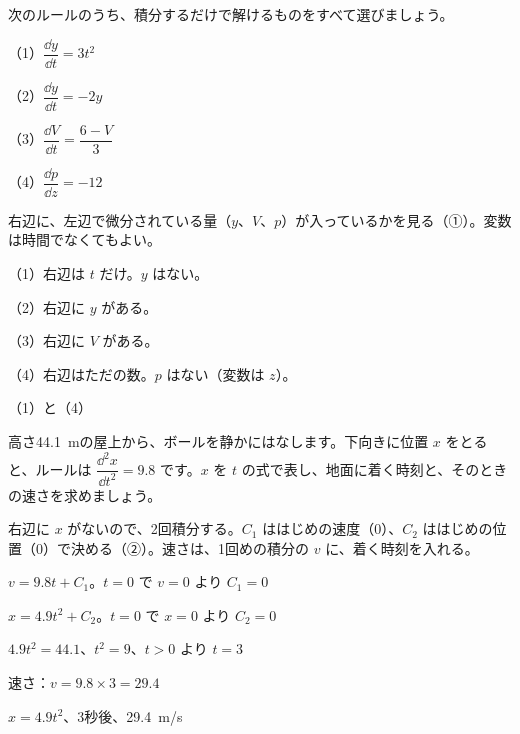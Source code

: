 \begin{kotoba}
\small
{}
\end{kotoba}


\begin{reidai}[積分するだけで解ける形を見分ける]
次のルールのうち、積分するだけで解けるものをすべて選びましょう。\par
（1）$\dfrac{\dd y}{\dd t}=3t^2$\par
（2）$\dfrac{\dd y}{\dd t}=-2y$\par
（3）$\dfrac{\dd V}{\dd t}=\dfrac{6-V}{3}$\par
（4）$\dfrac{\dd p}{\dd z}=-12$\par
\kangaekata 右辺に、左辺で微分されている量（$y$、$V$、$p$）が入っているかを見る（①）。変数は時間でなくてもよい。\par
\shiki（1）右辺は $t$ だけ。$y$ はない。\par
\bkvidl（2）右辺に $y$ がある。\par
\bkvidl（3）右辺に $V$ がある。\par
\bkvidl（4）右辺はただの数。$p$ はない（変数は $z$）。\par
\kotae （1）と（4）
\end{reidai}

\begin{reidai}[落ちるボール]
高さ\qty{44.1}{m}の屋上から、ボールを静かにはなします。下向きに位置 $x$ をとると、ルールは $\dfrac{\dd^2x}{\dd t^2}=9.8$ です。$x$ を $t$ の式で表し、地面に着く時刻と、そのときの速さを求めましょう。\par
\kangaekata 右辺に $x$ がないので、2回積分する。$C_1$ ははじめの速度（0）、$C_2$ ははじめの位置（0）で決める（②）。速さは、1回めの積分の $v$ に、着く時刻を入れる。\par
\shiki $v=9.8t+C_1$。$t=0$ で $v=0$ より $C_1=0$\par
\bkvidl $x=4.9t^2+C_2$。$t=0$ で $x=0$ より $C_2=0$\par
\bkvidl $4.9t^2=44.1$、$t^2=9$、$t>0$ より $t=3$\par
\bkvidl 速さ：$v=9.8\times3=29.4$\par
\kotae $x=4.9t^2$、3秒後、\qty{29.4}{m/s}
\end{reidai}


